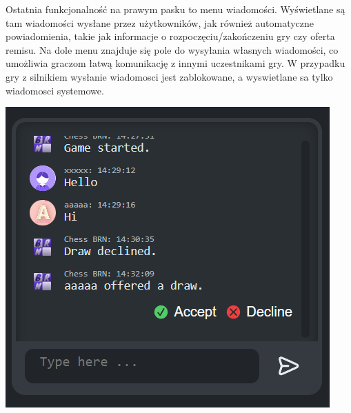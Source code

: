 \documentclass[12pt,a4paper]{article}
\begin{document}
\begin{minipage}[t]{0.45\textwidth} 
    \vspace{0pt} 
    \raggedright 
    Ostatnia funkcjonalność na prawym pasku to menu wiadomości. Wyświetlane są tam wiadomości wysłane przez użytkowników, jak również automatyczne powiadomienia, takie jak informacje o rozpoczęciu/zakończeniu gry czy oferta remisu. Na dole menu znajduje się pole do wysyłania własnych wiadomości, co umożliwia graczom łatwą komunikację z innymi uczestnikami gry. W przypadku gry z silnikiem wysłanie wiadomosci jest zablokowane, a wyswietlane sa tylko wiadomosci systemowe.
\end{minipage} 
\hfill 
\begin{minipage}[t]{0.45\textwidth} 
    \vspace{0pt} 
    \centering 
    \includegraphics[width=\linewidth]{images/ins_min_mess.png} 
\end{minipage}

\newpage
\end{document}
